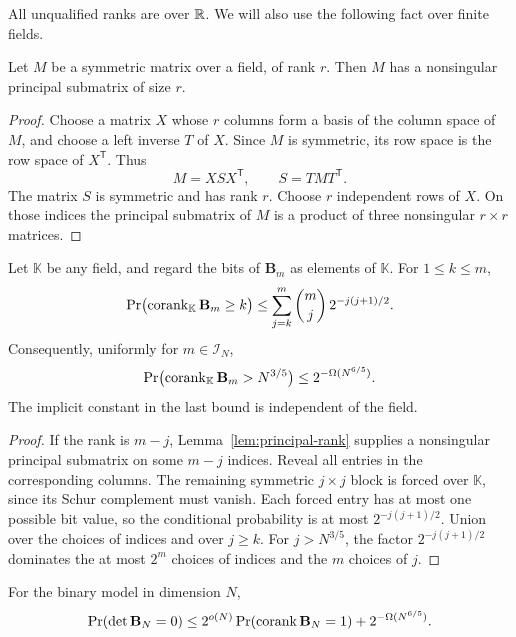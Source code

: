 All unqualified ranks are over \(\mathbb R\). We will also use the following
fact over finite fields.

\begin{lemma}\label{lem:principal-rank}
Let \(M\) be a symmetric matrix over a field, of rank \(r\). Then \(M\)
has a nonsingular principal submatrix of size \(r\).
\end{lemma}

\begin{proof}
Choose a matrix \(X\) whose \(r\) columns form a basis of the column
space of \(M\), and choose a left inverse \(T\) of \(X\). Since \(M\) is
symmetric, its row space is the row space of \(X^{\mathsf T}\). Thus
\[
 M=X S X^{\mathsf T},\qquad S=TMT^{\mathsf T}.
\]
The matrix \(S\) is symmetric and has rank \(r\). Choose \(r\) independent
rows of \(X\). On those indices the principal submatrix of \(M\) is a
product of three nonsingular \(r\times r\) matrices.
\end{proof}

\begin{lemma}\label{lem:corank-tail}
Let \(\mathbb K\) be any field, and regard the bits of \(\mathbf B_m\)
as elements of \(\mathbb K\). For \(1\le k\le m\),
\[
 \Pr\bigl(\operatorname{corank}_{\mathbb K}\mathbf B_m\ge k\bigr)
 \le \sum_{j=k}^{m}\binom mj\,2^{-j(j+1)/2}.
\]
Consequently, uniformly for \(m\in\mathcal I_N\),
\[
 \Pr\bigl(\operatorname{corank}_{\mathbb K}\mathbf B_m>N^{3/5}\bigr)
 \le 2^{-\Omega(N^{6/5})}.
\]
The implicit constant in the last bound is independent of the field.
\end{lemma}

\begin{proof}
If the rank is \(m-j\), Lemma~\ref{lem:principal-rank} supplies a
nonsingular principal submatrix on some \(m-j\) indices. Reveal all
entries in the corresponding columns. The remaining symmetric
\(j\times j\) block is forced over \(\mathbb K\), since its Schur
complement must vanish. Each forced entry has at most one possible bit
value, so the conditional probability is at most \(2^{-j(j+1)/2}\).
Union over the choices of indices and over \(j\ge k\). For
\(j>N^{3/5}\), the factor \(2^{-j(j+1)/2}\) dominates the at most
\(2^m\) choices of indices and the \(m\) choices of \(j\).
\end{proof}

\begin{lemma}\label{lem:corank-reduction}
For the binary model in dimension \(N\),
\[
 \Pr(\det\mathbf B_N=0)
 \le 2^{o(N)}\Pr(\operatorname{corank}\mathbf B_N=1)
       +2^{-\Omega(N^{6/5})}.
\]
\end{lemma}

